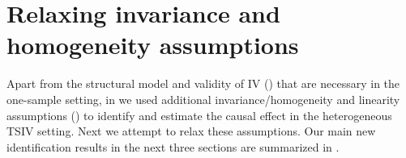 \documentclass[preprint]{imsart}
\begin{document}

\section{Relaxing invariance and homogeneity assumptions}
\label{sec:relax-invar-assumpt}

Apart from the structural model and validity of IV
() that are necessary in the
one-sample setting, in  we used additional
invariance/homogeneity and linearity assumptions
() to
identify and estimate the causal effect in the heterogeneous TSIV
setting. Next we attempt to relax these assumptions. Our main new
identification results in the next three sections are summarized in
.
\end{document}
